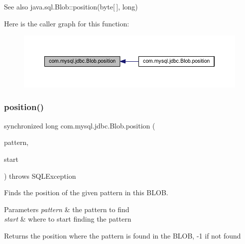\begin{DoxySeeAlso}{See also}
java.\+sql.\+Blob\+::position(byte\mbox{[}$\,$\mbox{]}, long) 
\end{DoxySeeAlso}
Here is the caller graph for this function\+:\nopagebreak
\begin{figure}[H]
\begin{center}
\leavevmode
\includegraphics[width=350pt]{classcom_1_1mysql_1_1jdbc_1_1_blob_a2559b772dc01c0b327cee87b1a5c119e_icgraph}
\end{center}
\end{figure}
\mbox{\label{classcom_1_1mysql_1_1jdbc_1_1_blob_a7ea2c2c3ebb85581cd54c5615e725a88}} 
\subsubsection{\texorpdfstring{position()}{position()}\hspace{0.1cm}{\footnotesize\ttfamily [2/2]}}
{\footnotesize\ttfamily synchronized long com.\+mysql.\+jdbc.\+Blob.\+position (\begin{DoxyParamCaption}\item[{java.\+sql.\+Blob}]{pattern,  }\item[{long}]{start }\end{DoxyParamCaption}) throws S\+Q\+L\+Exception}

Finds the position of the given pattern in this B\+L\+OB.


\begin{DoxyParams}{Parameters}
{\em pattern} & the pattern to find \\
\hline
{\em start} & where to start finding the pattern\\
\hline
\end{DoxyParams}
\begin{DoxyReturn}{Returns}
the position where the pattern is found in the B\+L\+OB, -\/1 if not found
\end{DoxyReturn}

